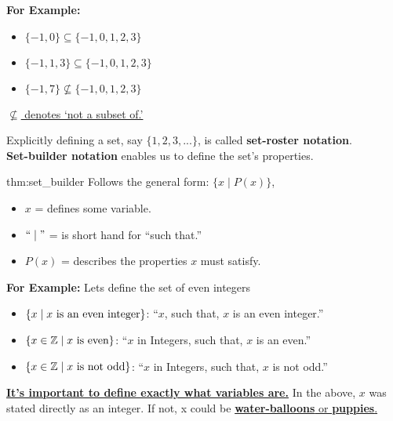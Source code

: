 \noindent
\textbf{For Example:}
\begin{itemize}
    \item $\{-1, 0\} \subseteq \{-1, 0, 1, 2, 3\}$
    \item $\{-1, 1, 3\} \subseteq \{-1, 0, 1, 2, 3\}$
    \item $\{-1, 7\} \not\subseteq \{-1, 0, 1, 2, 3\}$
\end{itemize}

\underline{$\not\subseteq$ denotes `not a subset of.'}

\vspace{2em}
\noindent
Explicitly defining a set, say $\{1, 2, 3, ...\}$, is called \textbf{set-roster notation}.\\
\textbf{Set-builder notation} enables us to define the set's properties.

\begin{theo}{thm:set_builder}
    Follows the general form: $\{x \mid P(x)\}$,
    \begin{itemize}
        \item $x$ = defines some variable.
        \item $``\mid"$ = is short hand for ``such that.''
        \item $P(x)$ = describes the properties $x$ must satisfy.
    \end{itemize}
\end{theo}

\noindent
\textbf{For Example:} Lets define the set of even integers\\
\vspace{-1em}
\begin{itemize}
    \item $\{x \mid x \textnormal{ is an even integer}\}$: ``$x$, such that, $x$ is an even integer.''
    \item $\{x \in \mathbb{Z} \mid x \textnormal{ is even}\}$: ``$x$ in Integers, such that, $x$ is an even.''
    \item $\{x \in \mathbb{Z} \mid x \textnormal{ is not odd}\}$: ``$x$ in Integers, such that, $x$ is not odd.''
\end{itemize}

\noindent
\underline{\textbf{It's important to define exactly what variables are.}}
In the above, $x$ was stated directly as an integer. If not, x could be \underline{\textbf{water-balloons} or \textbf{puppies}.}
